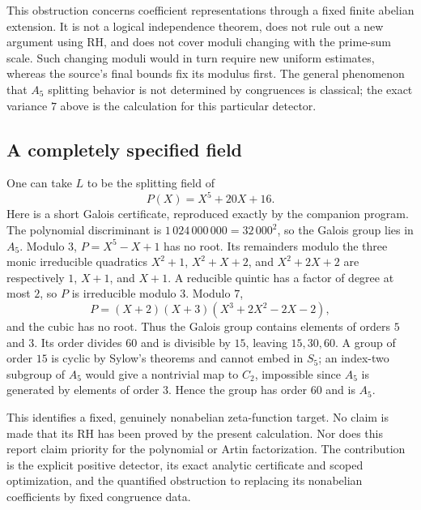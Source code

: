This obstruction concerns coefficient representations through a fixed finite
abelian extension.  It is not a logical independence theorem, does not rule
out a new argument using RH, and does not cover moduli changing with the
prime-sum scale.  Such changing moduli would in turn require new uniform
estimates, whereas the source's final bounds fix its modulus first.  The
general phenomenon that $A_5$ splitting behavior is not determined by
congruences is classical; the exact variance $7$ above is the calculation for
this particular detector.

\subsection{A completely specified field}

One can take $L$ to be the splitting field of
\[
 P(X)=X^5+20X+16.
\]
Here is a short Galois certificate, reproduced exactly by the companion
program.  The polynomial discriminant is
$1\,024\,000\,000=32\,000^2$, so the Galois group lies in $A_5$.
Modulo $3$, $P=X^5-X+1$ has no root.  Its remainders modulo the three monic
irreducible quadratics $X^2+1$, $X^2+X+2$, and $X^2+2X+2$ are respectively
$1$, $X+1$, and $X+1$.  A reducible quintic has a factor of degree at most
$2$, so $P$ is irreducible modulo $3$.  Modulo $7$,
\[
 P=(X+2)(X+3)(X^3+2X^2-2X-2),
\]
and the cubic has no root.  Thus the Galois group contains elements of orders
$5$ and $3$.  Its order divides $60$ and is divisible by $15$, leaving
$15,30,60$.  A group of order $15$ is cyclic by Sylow's theorems and cannot
embed in $S_5$; an index-two subgroup of $A_5$ would give a nontrivial map to
$C_2$, impossible since $A_5$ is generated by elements of order $3$.
Hence the group has order $60$ and is $A_5$.

This identifies a fixed, genuinely nonabelian zeta-function target.  No
claim is made that its RH has been proved by the present calculation.  Nor
does this report claim priority for the polynomial or Artin factorization.
The contribution is the explicit positive detector, its exact analytic
certificate and scoped optimization, and the quantified obstruction to
replacing its nonabelian coefficients by fixed congruence data.
